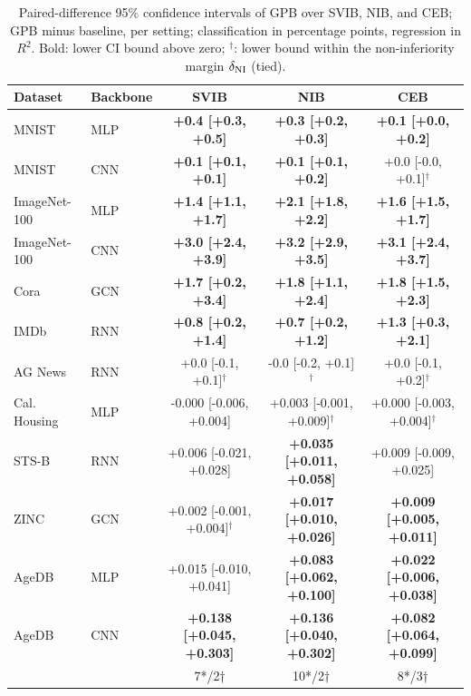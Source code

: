 \par\smallskip
\begin{table}[t]
\centering
\caption{Paired-difference 95\% confidence intervals of GPB over SVIB, NIB, and CEB; GPB minus baseline, per setting; classification in percentage points, regression in $R^2$. Bold: lower CI bound above zero; $^{\dagger}$: lower bound within the non-inferiority margin $\delta_{\rm NI}$ (tied).}
\label{tab:main_result_ci_variants}
\small
{
\setlength{\tabcolsep}{0.5pt}
\begin{tabular}{llccc}
\hline
Dataset & Backbone & SVIB & NIB & CEB \\
\hline
MNIST & MLP & \textbf{+0.4 [+0.3, +0.5]} & \textbf{+0.3 [+0.2, +0.3]} & \textbf{+0.1 [+0.0, +0.2]} \\
MNIST & CNN & \textbf{+0.1 [+0.1, +0.1]} & \textbf{+0.1 [+0.1, +0.2]} & +0.0 [-0.0, +0.1]$^{\dagger}$ \\
ImageNet-100 & MLP & \textbf{+1.4 [+1.1, +1.7]} & \textbf{+2.1 [+1.8, +2.2]} & \textbf{+1.6 [+1.5, +1.7]} \\
ImageNet-100 & CNN & \textbf{+3.0 [+2.4, +3.9]} & \textbf{+3.2 [+2.9, +3.5]} & \textbf{+3.1 [+2.4, +3.7]} \\
Cora & GCN & \textbf{+1.7 [+0.2, +3.4]} & \textbf{+1.8 [+1.1, +2.4]} & \textbf{+1.8 [+1.5, +2.3]} \\
IMDb & RNN & \textbf{+0.8 [+0.2, +1.4]} & \textbf{+0.7 [+0.2, +1.2]} & \textbf{+1.3 [+0.3, +2.1]} \\
AG News & RNN & +0.0 [-0.1, +0.1]$^{\dagger}$ & -0.0 [-0.2, +0.1]$^{\dagger}$ & +0.0 [-0.1, +0.2]$^{\dagger}$ \\
\hline\hline
Cal. Housing & MLP & -0.000 [-0.006, +0.004] & +0.003 [-0.001, +0.009]$^{\dagger}$ & +0.000 [-0.003, +0.004]$^{\dagger}$ \\
STS-B & RNN & +0.006 [-0.021, +0.028] & \textbf{+0.035 [+0.011, +0.058]} & +0.009 [-0.009, +0.025] \\
ZINC & GCN & +0.002 [-0.001, +0.004]$^{\dagger}$ & \textbf{+0.017 [+0.010, +0.026]} & \textbf{+0.009 [+0.005, +0.011]} \\
AgeDB & MLP & +0.015 [-0.010, +0.041] & \textbf{+0.083 [+0.062, +0.100]} & \textbf{+0.022 [+0.006, +0.038]} \\
AgeDB & CNN & \textbf{+0.138 [+0.045, +0.303]} & \textbf{+0.136 [+0.040, +0.302]} & \textbf{+0.082 [+0.064, +0.099]} \\
\hline
 &  & 7*/2† & 10*/2† & 8*/3† \\
\hline
\end{tabular}
}
\end{table}
